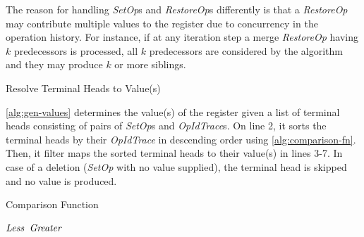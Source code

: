 \documentclass[sigplan,10pt]{acmart}
\newcommand{\setopkind}{\textit{SetOp}}
\newcommand{\restopkind}{\textit{RestoreOp}}
\newcommand{\opidtrace}{\textit{OpIdTrace}}
\begin{document}
The reason for handling \setopkind{}s and \restopkind{}s differently 
is that a \restopkind{} may contribute multiple values to
the register due to concurrency in the operation history.
For instance, if at any iteration step a merge \restopkind{} having $k$
predecessors is processed, all $k$ predecessors are considered by the algorithm
and they may produce $k$ or more siblings.

\begin{algorithm}
  \caption{Resolve Terminal Heads to Value(s)}\label{alg:gen-values}
  \begin{algorithmic}[1]
          \EndIf{}
        \EndFor{}
    \EndFunction{}
  \end{algorithmic}
\end{algorithm}

\autoref{alg:gen-values} determines the value(s) of the register
given a list of terminal heads consisting of pairs of \setopkind{}s and
\opidtrace{}s.
On line 2, it sorts the terminal heads by their \opidtrace{}
in descending order using \cref{alg:comparison-fn}.
Then, it filter maps the sorted terminal heads to their value(s) in lines 3-7.
In case of a deletion (\setopkind{} with no value supplied),
the terminal head is skipped and no value is produced.

\begin{algorithm}
  \caption{Comparison Function}\label{alg:comparison-fn}
  \begin{algorithmic}[1]
         \Return $\mathit{Less}$
         \Return $\mathit{Greater}$
        \EndIf{}
      \EndFor{}
    \EndFunction{}
  \end{algorithmic}
\end{algorithm}
\end{document}
